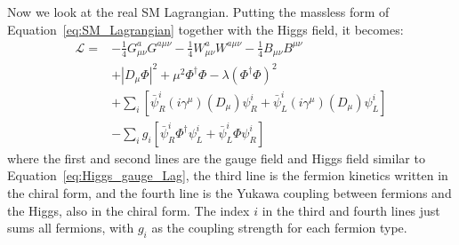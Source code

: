 Now we look at the real SM Lagrangian.
Putting the massless form of Equation~\ref{eq:SM_Lagrangian} together with the Higgs field, it becomes:
\begin{equation}\label{eq:SM_Lagrangian_Higgs}
  \begin{split}
    \mathcal{L} = &  - \frac{1}{4} G^{a}_{\mu\nu}G^{a\mu\nu}
                     - \frac{1}{4} W^{a}_{\mu\nu}W^{a\mu\nu}
                     - \frac{1}{4} B_{\mu\nu}B^{\mu\nu} \\
                  & + |D_{\mu}\Phi|^2 + \mu^{2} \Phi^{\dagger}\Phi - \lambda (\Phi^{\dagger}\Phi)^{2} \\
                  & + \sum_{i} [\bar{\psi}^{i}_{R} (i\gamma^{\mu})(D_{\mu})\psi^{i}_{R} + \bar{\psi}^{i}_{L} (i\gamma^{\mu})(D_{\mu})\psi^{i}_{L}] \\
                  & - \sum_{i} g_{i} [\bar{\psi}^{i}_{R}\Phi^{\dagger}\psi^{i}_{L} + \bar{\psi}^{i}_{L}\Phi\psi^{i}_{R}]
  \end{split} 
\end{equation}
where the first and second lines are the gauge field and Higgs field similar to Equation~\ref{eq:Higgs_gauge_Lag},
the third line is the fermion kinetics written in the chiral form,
and the fourth line is the Yukawa coupling between fermions and the Higgs, also in the chiral form.
The index $i$ in the third and fourth lines just sums all fermions, 
with $g_{i}$ as the coupling strength for each fermion type.

